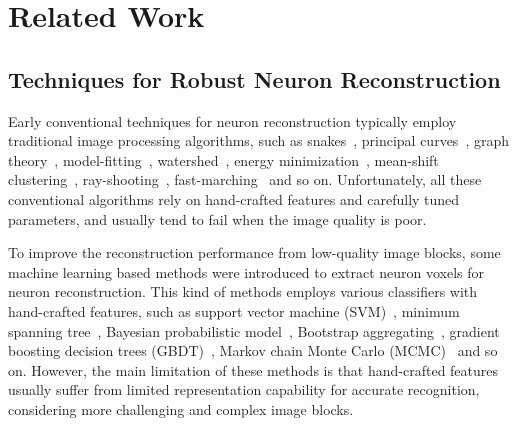 \section{Related Work}
\label{sec:related work}

\subsection{Techniques for Robust Neuron Reconstruction}
\label{sec:neuron reconstruction}
Early conventional techniques for neuron reconstruction typically employ traditional image processing algorithms, such as snakes~\cite{Wang2011, Cai2006}, principal curves~\cite{Bas2011}, graph theory~\cite{Peng2010a, Yang2013, De2016}, model-fitting~\cite{Zhao2011, Santamaria2015}, watershed~\cite{Navlakha2013, Suembuel2016}, energy minimization~\cite{Quan2013, Liu2016}, mean-shift clustering~\cite{Frasconi2014}, ray-shooting~\cite{Wu2014, Liu2019}, fast-marching~\cite{Peng2011, Xiao2013, Liu2018} and so on.
Unfortunately, all these conventional algorithms rely on hand-crafted features and carefully tuned parameters, and usually tend to fail when the image quality is poor.

To improve the reconstruction performance from low-quality image blocks, some machine learning based methods were introduced to extract neuron voxels for neuron reconstruction. This kind of methods employs various classifiers with hand-crafted features, such as support vector machine (SVM)~\cite{Chen2015}, minimum spanning tree~\cite{Basu2016}, Bayesian probabilistic model~\cite{Radojevic2017}, Bootstrap aggregating~\cite{Wang2017}, gradient boosting decision trees (GBDT)~\cite{Gu2017}, Markov chain Monte Carlo (MCMC)~\cite{Skibbe2015, Skibbe2019} and so on.
However, the main limitation of these methods is that hand-crafted features usually suffer from limited representation capability for accurate recognition, considering more challenging and complex image blocks.


